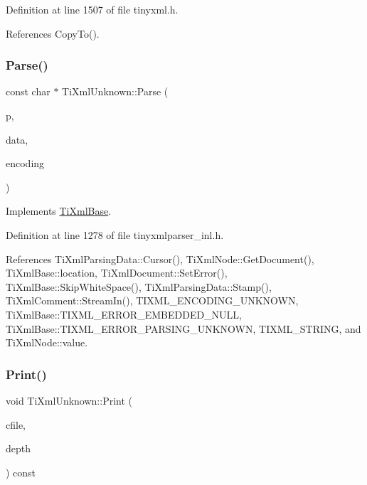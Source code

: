 Definition at line 1507 of file tinyxml.\+h.



References Copy\+To().

\hypertarget{class_ti_xml_unknown_aa51c2694e4177b5f0b5429ee5a81b58d}{}\label{class_ti_xml_unknown_aa51c2694e4177b5f0b5429ee5a81b58d} 
\subsubsection{\texorpdfstring{Parse()}{Parse()}}
{\footnotesize\ttfamily const char $\ast$ Ti\+Xml\+Unknown\+::\+Parse (\begin{DoxyParamCaption}\item[{const char $\ast$}]{p,  }\item[{\hyperlink{class_ti_xml_parsing_data}{Ti\+Xml\+Parsing\+Data} $\ast$}]{data,  }\item[{\hyperlink{tinyxml_8h_a88d51847a13ee0f4b4d320d03d2c4d96}{Ti\+Xml\+Encoding}}]{encoding }\end{DoxyParamCaption})\hspace{0.3cm}{\ttfamily [virtual]}}



Implements \hyperlink{class_ti_xml_base_a00e4edb0219d00a1379c856e5a1d2025}{Ti\+Xml\+Base}.



Definition at line 1278 of file tinyxmlparser\+\_\+inl.\+h.



References Ti\+Xml\+Parsing\+Data\+::\+Cursor(), Ti\+Xml\+Node\+::\+Get\+Document(), Ti\+Xml\+Base\+::location, Ti\+Xml\+Document\+::\+Set\+Error(), Ti\+Xml\+Base\+::\+Skip\+White\+Space(), Ti\+Xml\+Parsing\+Data\+::\+Stamp(), Ti\+Xml\+Comment\+::\+Stream\+In(), T\+I\+X\+M\+L\+\_\+\+E\+N\+C\+O\+D\+I\+N\+G\+\_\+\+U\+N\+K\+N\+O\+WN, Ti\+Xml\+Base\+::\+T\+I\+X\+M\+L\+\_\+\+E\+R\+R\+O\+R\+\_\+\+E\+M\+B\+E\+D\+D\+E\+D\+\_\+\+N\+U\+LL, Ti\+Xml\+Base\+::\+T\+I\+X\+M\+L\+\_\+\+E\+R\+R\+O\+R\+\_\+\+P\+A\+R\+S\+I\+N\+G\+\_\+\+U\+N\+K\+N\+O\+WN, T\+I\+X\+M\+L\+\_\+\+S\+T\+R\+I\+NG, and Ti\+Xml\+Node\+::value.

\hypertarget{class_ti_xml_unknown_a5793fbc48ab3419783c0e866ca2d334e}{}\label{class_ti_xml_unknown_a5793fbc48ab3419783c0e866ca2d334e} 
\subsubsection{\texorpdfstring{Print()}{Print()}}
{\footnotesize\ttfamily void Ti\+Xml\+Unknown\+::\+Print (\begin{DoxyParamCaption}\item[{F\+I\+LE $\ast$}]{cfile,  }\item[{int}]{depth }\end{DoxyParamCaption}) const\hspace{0.3cm}{\ttfamily [virtual]}}

